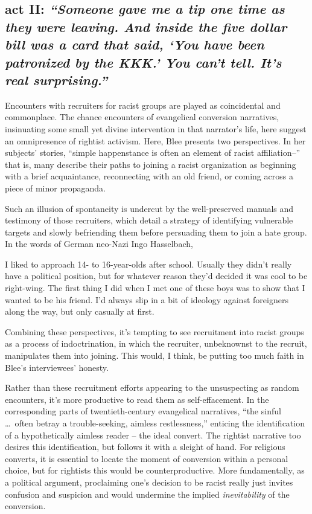\documentclass[11pt]{article}
\begin{document}


\subsection*{act II: {\itshape ``Someone gave me a tip one time as they were leaving. And inside the five dollar bill was a card that said, `You have been patronized by the KKK.' You can't tell. It's real surprising.''}\autocite[4]{Bl02}}

Encounters with recruiters for racist groups are played as coincidental and commonplace. The chance encounters of evangelical conversion narratives, insinuating some small yet divine intervention in that narrator's life, here suggest an omnipresence of rightist activism. Here, Blee presents two perspectives. In her subjects' stories, ``simple happenstance is often an element of racist affiliation--'' that is, many describe their paths to joining a racist organization as beginning with a brief acquaintance, reconnecting with an old friend, or coming across a piece of minor propaganda.\autocite[30]{Bl02}

Such an illusion of spontaneity is undercut by the well-preserved manuals and testimony of those recruiters, which detail a strategy of identifying vulnerable targets and slowly befriending them before persuading them to join a hate group. In the words of German neo-Nazi Ingo Hasselbach,
\begin{displayquote}
    I liked to approach 14- to 16-year-olds after school. Usually they didn't really have a political position, but for whatever reason they'd decided it was cool to be right-wing. The first thing I did when I met one of these boys was to show that I wanted to be his friend. I'd always slip in a bit of ideology against foreigners along the way, but only casually at first.\autocite[28]{Bl02}
\end{displayquote}
Combining these perspectives, it's tempting to see recruitment into racist groups as a process of indoctrination, in which the recruiter, unbeknownst to the recruit, manipulates them into joining. This would, I think, be putting too much faith in Blee's interviewees' honesty. 

Rather than these recruitment efforts appearing to the unsuspecting as random encounters, it's more productive to read them as self-effacement. In the corresponding parts of twentieth-century evangelical narratives, ``the sinful \dots\ often betray a trouble-seeking, aimless restlessness,'' enticing the identification of a hypothetically aimless reader -- the ideal convert.\autocite[50]{Br91} The rightist narrative too desires this identification, but follows it with a sleight of hand. For religious converts, it is essential to locate the moment of conversion within a personal choice, but for rightists this would be counterproductive. More fundamentally, as a political argument, proclaiming one's decision to be racist really just invites confusion and suspicion and would undermine the implied \textit{inevitability} of the conversion.
\end{document}
